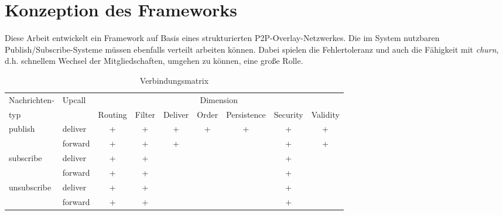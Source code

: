 \chapter{Konzeption des Frameworks}
\label{chap:konzeption_pubsub}
Diese Arbeit entwickelt ein Framework auf Basis eines strukturierten P2P-Overlay-Netzwerkes. Die im System nutzbaren Publish/Subscribe-Systeme müssen ebenfalls verteilt arbeiten können. Dabei spielen die Fehlertoleranz und auch die Fähigkeit mit \emph{churn}, d.h. schnellem Wechsel der Mitgliedschaften, umgehen zu können, eine große Rolle.

\begin{table}[!h]
\label{tab:konzeption_pubsub:verbindungsmatrix}
\begin{tabular}{llccccccc}
\toprule
Nachrichten- & Upcall	& \multicolumn{7}{c}{Dimension} \\
\cmidrule{3-9}
typ				&		& Routing & Filter & Deliver & Order & Persistence & Security & Validity \\
\midrule
publish	    & deliver & + & + & + & + & + & + & + \\
\cmidrule{2-9}
					  & forward & + & + & + &   &   & + & + \\
\midrule
subscribe	  & deliver & + & + &   &   &   & + & \\
\cmidrule{2-9}
			      & forward & + & + &   &   &   & + & \\
\midrule
unsubscribe & deliver & + & + &   &   &   & + & \\
\cmidrule{2-9}
      & forward & + & + &   &   &   & + & \\
\bottomrule
\end{tabular}
\caption{Verbindungsmatrix}
\end{table}






\cite{BeFiMu2006PubSubQoS}


\cite{KostasKatrinis2005}
